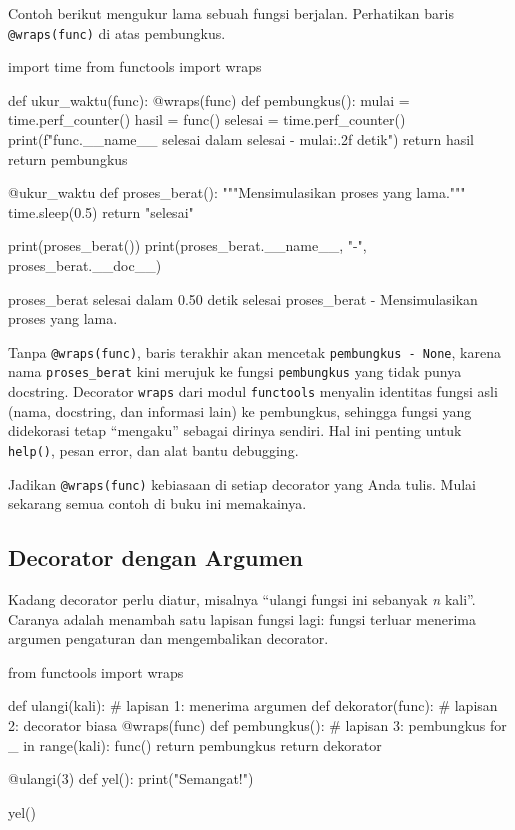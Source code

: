 Contoh berikut mengukur lama sebuah fungsi berjalan. Perhatikan baris \texttt{@wraps(func)} di atas pembungkus.

\begin{kode}
import time
from functools import wraps

def ukur_waktu(func):
    @wraps(func)
    def pembungkus():
        mulai = time.perf_counter()
        hasil = func()
        selesai = time.perf_counter()
        print(f"{func.__name__} selesai dalam {selesai - mulai:.2f} detik")
        return hasil
    return pembungkus

@ukur_waktu
def proses_berat():
    """Mensimulasikan proses yang lama."""
    time.sleep(0.5)
    return "selesai"

print(proses_berat())
print(proses_berat.__name__, "-", proses_berat.__doc__)
\end{kode}

\begin{keluaran}
proses_berat selesai dalam 0.50 detik
selesai
proses_berat - Mensimulasikan proses yang lama.
\end{keluaran}

Tanpa \texttt{@wraps(func)}, baris terakhir akan mencetak \texttt{pembungkus - None}, karena nama \texttt{proses\_berat} kini merujuk ke fungsi \texttt{pembungkus} yang tidak punya docstring. Decorator \texttt{wraps} dari modul \texttt{functools} menyalin identitas fungsi asli (nama, docstring, dan informasi lain) ke pembungkus, sehingga fungsi yang didekorasi tetap ``mengaku'' sebagai dirinya sendiri. Hal ini penting untuk \texttt{help()}, pesan error, dan alat bantu debugging.

\begin{tips}
Jadikan \texttt{@wraps(func)} kebiasaan di setiap decorator yang Anda tulis. Mulai sekarang semua contoh di buku ini memakainya.
\end{tips}

\subsection{Decorator dengan Argumen}

Kadang decorator perlu diatur, misalnya ``ulangi fungsi ini sebanyak \emph{n} kali''. Caranya adalah menambah satu lapisan fungsi lagi: fungsi terluar menerima argumen pengaturan dan mengembalikan decorator.

\begin{kode}
from functools import wraps

def ulangi(kali):                  # lapisan 1: menerima argumen
    def dekorator(func):           # lapisan 2: decorator biasa
        @wraps(func)
        def pembungkus():          # lapisan 3: pembungkus
            for _ in range(kali):
                func()
        return pembungkus
    return dekorator

@ulangi(3)
def yel():
    print("Semangat!")

yel()
\end{kode}

